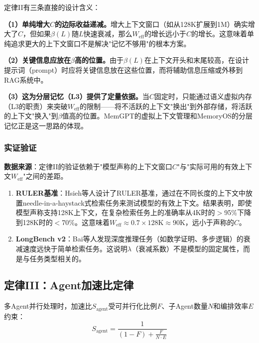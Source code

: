 定律II有三条直接的设计含义：

\textbf{（1）单纯增大$C$的边际收益递减。}增大上下文窗口（如从128K扩展到1M）确实增大了$C$，但如果$\beta(L)$随$L$快速衰减，那么$W_{\mathrm{eff}}$的增长远小于$C$的增长。这意味着单纯追求更大的上下文窗口不是解决"记忆不够用"的根本方案。

\textbf{（2）关键信息应放在$\beta$高的位置。}由于$\beta(L)$在上下文开头和末尾较高，在设计提示词（prompt）时应将关键信息放在这些位置，而将辅助信息压缩或外移到RAG系统中。

\textbf{（3）这为分层记忆（L3）提供了定量依据。}当$C$固定时，只能通过语义虚拟内存（L3的职责）来突破$W_{\mathrm{eff}}$的限制——将不活跃的上下文"换出"到外部存储，将活跃的上下文"换入"到$\beta$值高的位置。MemGPT的虚拟上下文管理\cite{memgpt2023}和MemoryOS的分层记忆\cite{memoryos2025}正是这一思路的体现。

\subsubsection{实证验证}

\textbf{数据来源}：定律II的验证依赖于"模型声称的上下文窗口$C$"与"实际可用的有效上下文$W_{\mathrm{eff}}$"之间的差距。

\begin{enumerate}[nosep]
\item \textbf{RULER基准}：Hsieh等人设计了RULER基准，通过在不同长度的上下文中放置needle-in-a-haystack式检索任务来测试模型的有效上下文\cite{ruler2024}。结果表明，即使模型声称支持128K上下文，在复杂检索任务上的准确率从4K时的$>$95\%下降到128K时的$<$70\%。这意味着$W_{\mathrm{eff}} \approx 0.7 \times 128\mathrm{K} \approx 90\mathrm{K}$，远小于声称的$C$。

\item \textbf{LongBench v2}：Bai等人发现深度推理任务（如数学证明、多步逻辑）的衰减速度远快于简单检索任务\cite{longbenchv2_2024}。这说明$\lambda$（衰减系数）不是模型的固定属性，而是与任务类型相关的。
\end{enumerate}

\subsection{定律III：Agent加速比定律}
\label{sec:law3}

\begin{law}[Agent加速比定律]
多Agent并行处理时，加速比$S_{\mathrm{agent}}$受可并行化比例$F$、子Agent数量$N$和编排效率$E$约束：
\begin{equation}
\label{eq:agent}
S_{\mathrm{agent}} = \frac{1}{(1-F) + \frac{F}{N \cdot E}}
\end{equation}
\end{law}

